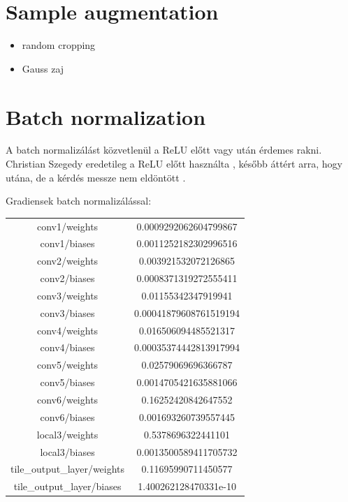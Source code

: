 \documentclass{article}
\begin{document}
\section{Sample augmentation}
\begin{itemize}
    \item random cropping
    \item Gauss zaj
\end{itemize}

\section{Batch normalization}

A batch normalizálást közvetlenül a ReLU előtt vagy után érdemes rakni. Christian Szegedy eredetileg a ReLU előtt használta \cite{ioffe2015batch}, később áttért arra, hogy utána, de a kérdés messze nem eldöntött \cite{fcholl_batch_norm_szegedy}.

Gradiensek batch normalizálással:

\begin{center}
\begin{tabular}{|c|c|}
	 \hline
		conv1/weights & 0.0009292062604799867 \\ 
		conv1/biases & 0.0011252182302996516 \\ 
		conv2/weights & 0.003921532072126865 \\ 
		conv2/biases & 0.0008371319272555411 \\ 
		conv3/weights & 0.01155342347919941 \\ 
		conv3/biases & 0.00041879608761519194 \\ 
		conv4/weights & 0.016506094485521317 \\ 
		conv4/biases & 0.00035374442813917994 \\ 
		conv5/weights & 0.02579069696366787 \\ 
		conv5/biases & 0.0014705421635881066 \\ 
		conv6/weights & 0.16252420842647552 \\ 
		conv6/biases & 0.001693260739557445 \\ 
		local3/weights & 0.5378696322441101 \\ 
		local3/biases & 0.0013500589411705732 \\ 
		tile\_output\_layer/weights & 0.11695990711450577 \\ 
		tile\_output\_layer/biases & 1.400262128470331e-10 \\ 
	\hline
\end{tabular}
\end{center}




\end{document}
